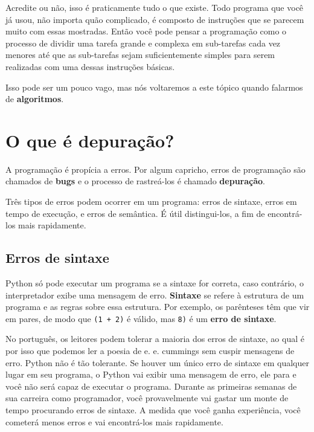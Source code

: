\documentclass[10pt]{book}
\begin{document}
Acredite ou não, isso é praticamente tudo o que existe. Todo
programa que você já usou, não importa quão complicado, é composto de
instruções que se parecem muito com essas mostradas. Então você pode pensar
a programação como o processo de dividir uma tarefa grande e complexa
em sub-tarefas cada vez menores até que as sub-tarefas sejam
suficientemente simples para serem realizadas com uma dessas instruções básicas.

Isso pode ser um pouco vago, mas nós voltaremos a este tópico
quando falarmos de {\bf algoritmos}.

\section{O que é depuração?}

A programação é propícia a erros. Por algum capricho, erros de programação
são chamados de {\bf bugs} e o processo de rastreá-los é chamado
{\bf depuração}.

Três tipos de erros podem ocorrer em um programa: erros de sintaxe, erros
em tempo de execução, e erros de semântica. É útil
distingui-los, a fim de encontrá-los mais rapidamente.

\subsection{Erros de sintaxe}

Python só pode executar um programa se a sintaxe for
correta, caso contrário, o interpretador exibe uma mensagem de erro.
{\bf Sintaxe} se refere à estrutura de um programa e as regras sobre
essa estrutura.
Por exemplo, os parênteses têm que vir em pares, de modo que
{\tt (1 + 2)} é válido, mas {\tt 8)} é um {\bf erro de sintaxe}.

No português, os leitores podem tolerar a maioria dos erros de sintaxe, ao qual é por isso que
podemos ler a poesia de e. e. cummings sem cuspir mensagens de erro.
Python não é tão tolerante. Se houver um único erro de sintaxe
em qualquer lugar em seu programa, o Python vai exibir uma mensagem de erro, ele para
e você não será capaz de executar o programa. Durante as primeiras
semanas de sua carreira como programador, você provavelmente vai gastar um monte de
tempo procurando erros de sintaxe. A medida que você ganha experiência, você
cometerá menos erros e vai encontrá-los mais rapidamente.
\end{document}
